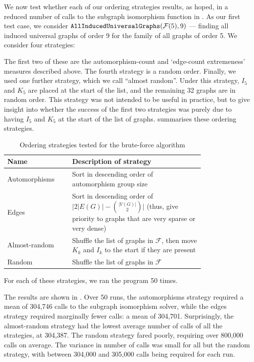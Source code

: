 \documentclass[12pt]{article}
\newcommand{\calF}{\ensuremath{\mathcal{F}}}
\begin{document}
We now test whether each of our ordering strategies results, as hoped,
in a reduced number of calls to the subgraph isomorphism function
in .  As our first test case, we consider 
$\FuncSty{AllInducedUniversalGraphs}(\calF(5),9)$ ---
finding all induced universal graphs of order 9 for the family of
all graphs of order 5.  We consider four strategies:

The first two of these are the automorphism-count and `edge-count extremeness'
measures described above.  The fourth strategy is a random order.
Finally, we used one further strategy, which we call ``almost random''.
Under this strategy, $I_5$ and $K_5$ are placed at the start of the list,
and the remaining 32 graphs are in random order.  This strategy was not
intended to be useful in practice, but to give insight into whether
the success of the first two strategies was purely due to having
$I_5$ and $K_5$ at the start of the list of graphs. 
summarises these ordering strategies.

\begin{table}[h!]
\centering
 \begin{tabular}{p{0.25\linewidth} p{0.55\linewidth}}
 \toprule
    Name & Description of strategy \\ [0.5ex]
 \midrule
    Automorphisms & Sort in descending order of automorphism group size \\
    Edges & Sort in descending order of $\big|{2|E(G)| - {|V(G)| \choose 2}}\big|$ 
            (thus, give priority to graphs that are very sparse or very dense)\\
    Almost-random & Shuffle the list of graphs in $\calF$, then move $K_k$ and $I_k$ to the start if they are present \\
    Random & Shuffle the list of graphs in $\calF$ \\
 \bottomrule
\end{tabular}
\caption{Ordering strategies tested for the brute-force algorithm}
\label{tab:ordering-strategies}
\end{table}

For each of these strategies, we ran the program 50 times.

The results are shown in .  Over 50 runs,
the automorphisms strategy required a mean of 304,746 calls to the subgraph
isomorphism solver, while the edges strategy required marginally fewer
calls:  a mean of 304,701.  Surprisingly, the almost-random
strategy had the lowest average number of calls of all the strategies,
at 304,387.  The random strategy fared poorly, requiring over 800,000
calls on average.
The variance in number of calls was small for all but the random strategy,
with between 304,000 and 305,000 calls being required for each run.
\end{document}
